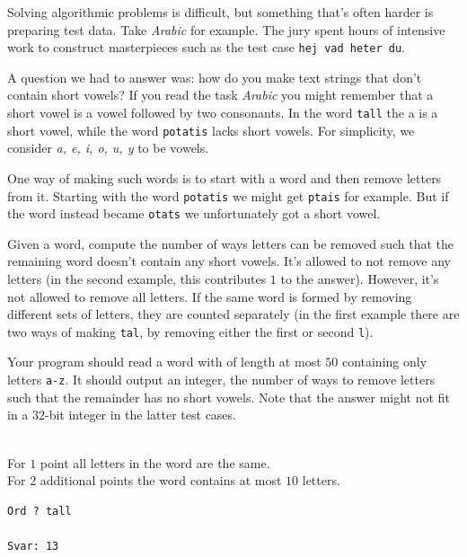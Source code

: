 \newpage
{}

Solving algorithmic problems is difficult, but something that's often harder is preparing test data.
Take \textit{Arabic} for example.
The jury spent hours of intensive work to construct masterpieces such as the test case \texttt{hej vad heter du}.

A question we had to answer was: how do you make text strings that don't contain short vowels?
If you read the task \textit{Arabic} you might remember that a short vowel is a vowel followed by two consonants.
In the word \texttt{tall} the a is a short vowel, while the word \texttt{potatis} lacks short vowels.
For simplicity, we consider \textit{a, e, i, o, u, y} to be vowels.

One way of making such words is to start with a word and then remove letters from it.
Starting with the word \texttt{potatis} we might get \texttt{ptais} for example.
But if the word instead became \texttt{otats} we unfortunately got a short vowel.

Given a word, compute the number of ways letters can be removed such that the remaining word doesn't contain any short vowels.
It's allowed to not remove any letters (in the second example, this contributes $1$ to the answer).
However, it's not allowed to remove all letters.
If the same word is formed by removing different sets of letters, they are counted separately (in the first example there are two ways of making \texttt{tal}, by removing either the first or second \texttt{l}).

Your program should read a word with of length at most $50$ containing only letters \texttt{a-z}.
It should output an integer, the number of ways to remove letters such that the remainder has no short vowels.
Note that the answer might not fit in a $32$-bit integer in the latter test cases.

\\
For $1$ point all letters in the word are the same.\\
For $2$ additional points the word contains at most $10$ letters.


\vspace{1cm}

\begin{verbatim}
Ord ? tall

Svar: 13
\end{verbatim}

\vspace{1cm}


